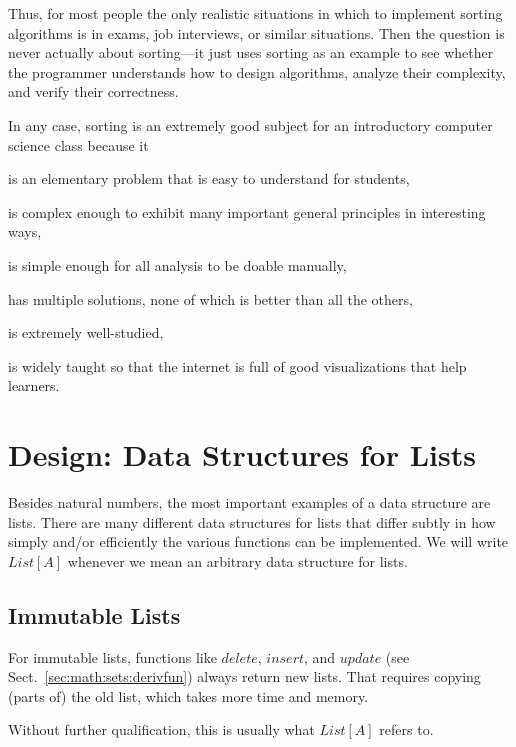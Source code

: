 Thus, for most people the only realistic situations in which to implement sorting algorithms is in exams, job interviews, or similar situations.
Then the question is never actually about sorting---it just uses sorting as an example to see whether the programmer understands how to design algorithms, analyze their complexity, and verify their correctness.

In any case, sorting is an extremely good subject for an introductory computer science class because it
\begin{compactitem}
 \item is an elementary problem that is easy to understand for students,
 \item is complex enough to exhibit many important general principles in interesting ways,
 \item is simple enough for all analysis to be doable manually,
 \item has multiple solutions, none of which is better than all the others,
 \item is extremely well-studied,
 \item is widely taught so that the internet is full of good visualizations that help learners.
\end{compactitem}


\section{Design: Data Structures for Lists}\label{sec:ad:list:ds}


Besides natural numbers, the most important examples of a data structure are lists.
There are many different data structures for lists that differ subtly in how simply and/or efficiently the various functions can be implemented.
We will write $List[A]$ whenever we mean an arbitrary data structure for lists.

\subsection{Immutable Lists}

For immutable lists, functions like $delete$, $insert$, and $update$ (see Sect.~\ref{sec:math:sets:derivfun}) always return new lists.
That requires copying (parts of) the old list, which takes more time and memory.

Without further qualification, this is usually what $List[A]$ refers to.

